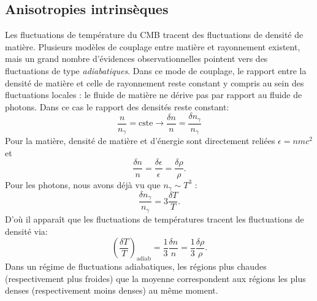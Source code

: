 \subsection{Anisotropies intrinsèques}
Les fluctuations de température du CMB tracent des fluctuations de densité de matière. Plusieurs modèles de couplage entre matière et rayonnement existent, mais un grand nombre d'évidences observationnelles pointent vers des fluctuations de type \textit{adiabatiques}. Dans ce mode de couplage, le rapport entre la densité de matière et celle de rayonnement reste constant y compris au sein des fluctuations locales : le fluide de matière ne dérive pas par rapport au fluide de photons. Dans ce cas le rapport des densités reste constant:
\begin{equation}
\frac{n}{n_\gamma}=\mathrm{cste}\rightarrow\frac{\delta n}{n}=\frac{\delta n_\gamma}{n_\gamma}
\end{equation}
Pour la matière, densité de matière et d'énergie sont directement reliées $\epsilon=n m c^2$  et
\begin{equation}
\frac{\delta n}{n}=\frac{\delta \epsilon}{\epsilon}=\frac{\delta \rho}{\rho}.
\end{equation}
Pour les photons, nous avons déjà vu que $n_\gamma \sim T^3$ :
\begin{equation}
\frac{\delta n_\gamma}{n_\gamma}=3 \frac{\delta T}{T}.
\end{equation}
D'où il apparaît que les fluctuations de températures tracent les fluctuations de densité via:
\begin{equation}
\left(\frac{\delta T}{T}\right)_\mathrm{adiab}=\frac{1}{3}\frac{\delta n}{n}=\frac{1}{3}\frac{\delta \rho}{\rho}.
\end{equation}
Dans un régime de fluctuations adiabatiques, les régions plus chaudes (respectivement plus froides) que la moyenne correspondent aux régions les plus denses (respectivement moins denses) au même moment. 

